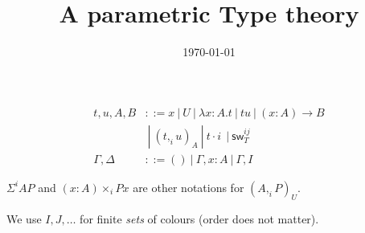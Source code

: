 \documentclass[10pt,a4paper]{article}
\title{A parametric Type theory}
\author{}
\date{\today}
\newcommand\CC[4]{(#2,_{#1} #3)_{#4}}
\newcommand\CSig[1]{\Sigma^{#1}}
\newcommand\sw[2]{\mathsf{sw}^{#1}_{#2}}
\newcommand\param[1]{\!\cdot\!#1~}
\begin{document}
\maketitle


\begin{definition}
  
  \begin{align*}
    t,u,A,B & ::= x ~|~ U ~|~ λx:A. t      ~|~ t u ~|~ (x:A) → B \\
            & ~|~ \CC i t u A  ~|~ t \param i ~|~ \sw {ij} T \\
    \Gamma,\Delta & ::= () ~|~ \Gamma,x:A ~|~ \Gamma,I 
  \end{align*}
\end{definition}
$\CSig i A P$ and $(x:A) ×_i P x$ are other notations for $(A ,_i P)_U$.

 We use $I,J,…$ for finite {\em sets} of colours (order does not matter).
\end{document}
